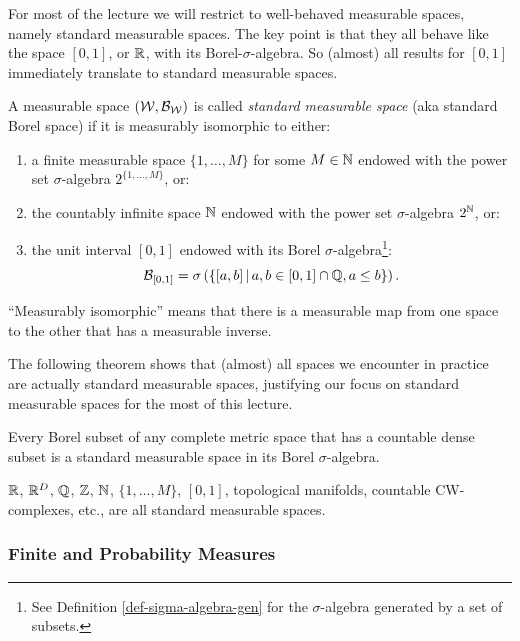 For most of the lecture we will restrict to well-behaved measurable spaces, namely standard measurable spaces. 
The key point is that they all behave like the space $[0,1]$, or $\mathbb{R}$, with its Borel-$\sigma$-algebra. So (almost) all results for $[0,1]$ immediately translate to standard measurable spaces. 


\begin{Def}
 A measurable space $(\mathcal{W},\mathcal{B}_{\mathcal{W}})$ is called \emph{standard measurable space} (aka standard Borel space) if it is measurably isomorphic to either:
    \begin{enumerate}
        \item a finite measurable space $\{1,\dots,M\}$ for some $M \in \mathbb{N}$ endowed with the power set $\sigma$-algebra $2^{\{1,\dots,M\}}$, or:
        \item the countably infinite space $\mathbb{N}$ endowed with the power set $\sigma$-algebra $2^{\mathbb{N}}$, or:
        \item the unit interval $[0,1]$ endowed with its Borel $\sigma$-algebra\footnote{See Definition \ref{def-sigma-algebra-gen} for the $\sigma$-algebra generated by a set of subsets.}:
           \[\mathcal{B}_{[0,1]} =\sigma\left (\left \{ [a,b] \,\middle|\, a, b \in [0,1] \cap \mathbb{Q}, a \le b \right \} \right ).\]
    \end{enumerate}
    ``Measurably isomorphic'' means that there is a measurable map from one space to the other that has a measurable inverse.
\end{Def}

The following theorem shows that (almost) all spaces we encounter in practice are actually standard measurable spaces, justifying our focus on standard measurable spaces for the most of this lecture.

\begin{Thm}
        Every Borel subset of any complete metric space that has a countable dense subset is a standard measurable space in its Borel $\sigma$-algebra.
\end{Thm}

\begin{Eg}
    $\mathbb{R}$, $\mathbb{R}^D$, $\mathbb{Q}$, $\mathbb{Z}$, $\mathbb{N}$, $\{1,\dots,M\}$,  $[0,1]$, topological manifolds, countable CW-complexes, etc., are all standard measurable spaces. 
\end{Eg}


\subsubsection{Finite and Probability Measures}

